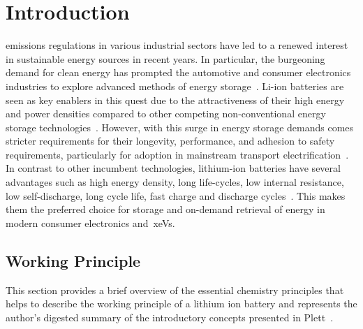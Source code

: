 
\newpage
\thispagestyle{plain} %
\mbox{}
\graphicspath{{chapters/introduction/figures/}}
\clearpage
\chapter{Introduction}\label{ch:intro}
\startcontents[chapters]

\bigskip
\vspace*{5mm}

 emissions  regulations in various  industrial sectors
have led  to a renewed interest  in sustainable energy sources  in recent years.
In  particular,  the  burgeoning  demand  for  clean  energy  has  prompted  the
automotive and  consumer electronics industries  to explore advanced  methods of
energy storage~\cite{Weiss2011}. Li-ion batteries are  seen  as  key enablers
in this  quest due  to  the attractiveness  of their  high energy  and power
densities compared  to  other competing  non-conventional energy  storage
technologies~\cite{Ibrahim2008}.  However, with this  surge  in energy  storage
demands  comes  stricter  requirements  for  their  longevity,  performance,
and adhesion  to  safety  requirements,  particularly  for  adoption  in
mainstream transport  electrification~\cite{Andrea2010}.  In  contrast to  other
incumbent technologies,  lithium-ion batteries  have several  advantages such
as high  energy density,  long life-cycles,  low internal  resistance, low
self-discharge, long cycle life,  fast charge  and discharge
cycles~\cite{Reddy2011,Plett2015}. This makes them the preferred choice for
storage and on-demand retrieval of energy in modern consumer electronics
and~\glspl{xeV}.


\section{Working Principle}\label{subsec:liionchemistry}

This section  provides a  brief overview of  the essential  chemistry principles
that  helps  to  describe the  working  principle  of  a  lithium ion  battery
and represents the author's digested summary  of the introductory concepts
presented in Plett~\cite{Plett2015}.

